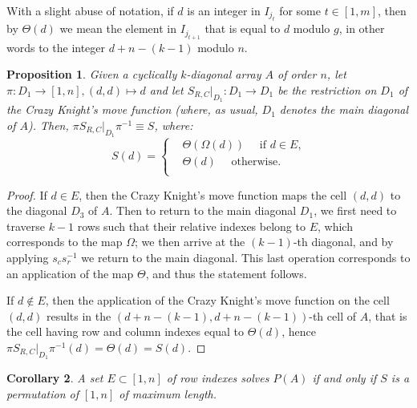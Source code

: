 \documentclass{amsart}
\newtheorem{prop}{Proposition}[section]
\newtheorem{cor}[prop]{Corollary}
\theoremstyle{definition}
\numberwithin{equation}{section}
\begin{document}
 With a slight abuse of notation, if $d$ is an integer in $I_{j_t}$ for some $t \in [1,m]$, then by $\Theta(d)$ we mean the element in $I_{j_{t+1}}$ that is equal to $d$ modulo $g$, in other words to the integer $d + n-(k-1)$ modulo $n$.



\begin{prop}
Given a cyclically $k$-diagonal array $A$ of order $n$, let $\pi: D_1 \rightarrow [1,n], (d,d) \mapsto d$ and let $S_{R,C}|_{D_1}: D_1 \rightarrow D_1$ be the restriction on $D_1$ of the Crazy Knight's move function (where, as usual, $D_1$ denotes the main diagonal of $A$). Then, $\pi S_{R,C}|_{D_1}\pi^{-1} \equiv S $,  where: 
\begin{equation} \label{eq:move_fun_diag}
S(d)= \left\{ 
\begin{aligned}
&\Theta(\Omega(d)) \quad\text{ if $d \in E$,} \\
&\Theta(d) \quad\text{ otherwise.} \\
\end{aligned}
\right. 
\end{equation}
\end{prop}
\begin{proof}
If $d \in E$, then  the Crazy Knight's move function maps the cell $(d,d)$ to the  diagonal $D_3$ of $A$. Then to return to the main diagonal $D_1$, we first need to traverse $k-1$ rows such that their relative indexes belong to $E$, which corresponds to the map $\Omega$; we then arrive at the $(k-1)$-th diagonal, and by applying $s_c s_r^{-1}$ we return to the main diagonal. This last operation corresponds to an application of the map $\Theta$, and thus the statement follows.


If $d \not \in E$, then the application of  the Crazy Knight's move function on the cell $(d,d)$ results in the $(d+n-(k-1),d+n-(k-1))$-th cell of $A$, that is the cell having row and column indexes equal to $\Theta(d)$, hence $\pi S_{R,C}|_{D_1}\pi^{-1}(d) =\Theta(d) =S(d)$. 
\end{proof}




\begin{cor}
A set $E \subset [1,n]$ of row indexes solves $P(A)$ if and only if  $S$ is a permutation of $[1,n]$ of maximum length.
\end{cor}
\end{document}

